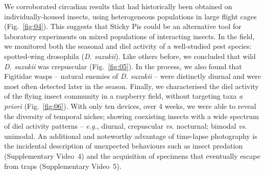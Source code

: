 \documentclass[12pt]{article}
\providecommand{\DIFaddend}{} %
\DeclareRobustCommand{\DIFaddend}{\DIFOaddend \let\includegraphics\DIFOincludegraphics} %
\begin{document}
\begin{linenumbers}
		\DIFaddend We corroborated circadian results that had historically been obtained on individually-housed insects, using heterogeneous populations in large flight cages (Fig.~\ref{fig:04}). This suggests that Sticky Pis could be an alternative tool for laboratory experiments on mixed populations of interacting insects. In the field, we monitored both the seasonal and diel activity of a well-studied pest species: spotted-wing drosophila (\emph{D. suzukii}). Like others before\cite{swoboda-bhattarai_diurnal_2020}, we concluded that wild \emph{D. suzukii} was crepuscular (Fig.~\ref{fig:05}). In the process, we also found that Figitidae wasps – natural enemies of \emph{D. suzukii} – were distinctly diurnal and were most often detected later in the season. Finally, we characterised the diel activity of the flying insect community in a raspberry field, without targeting taxa \emph{a priori} (Fig.~\ref{fig:06}). With only ten devices, over 4 weeks, we were able to reveal the diversity of temporal niches; showing coexisting insects with a wide spectrum of diel activity patterns – \emph{e.g.}, diurnal, crepuscular \emph{vs.} nocturnal; bimodal \emph{vs.} unimodal. An additional and noteworthy advantage of time-lapse photography is the incidental description of unexpected behaviours such as insect predation (Supplementary Video~4) and the acquisition of specimens that eventually escape from traps  (Supplementary Video~5).


\end{linenumbers}
\end{document}
